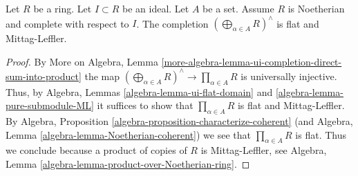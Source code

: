 \begin{lemma}
\label{lemma-completed-direct-sum-ML}
Let $R$ be a ring. Let $I \subset R$ be an ideal. Let $A$ be a set.
Assume $R$ is Noetherian and complete with respect to $I$. The completion
$(\bigoplus\nolimits_{\alpha \in A} R)^\wedge$
is flat and Mittag-Leffler.
\end{lemma}

\begin{proof}
By
More on Algebra, Lemma
\ref{more-algebra-lemma-ui-completion-direct-sum-into-product}
the map $(\bigoplus\nolimits_{\alpha \in A} R)^\wedge
\to \prod_{\alpha \in A} R$ is universally injective.
Thus, by
Algebra, Lemmas \ref{algebra-lemma-ui-flat-domain} and
\ref{algebra-lemma-pure-submodule-ML}
it suffices to show that $\prod_{\alpha \in A} R$ is flat and Mittag-Leffler.
By
Algebra, Proposition \ref{algebra-proposition-characterize-coherent}
(and
Algebra, Lemma \ref{algebra-lemma-Noetherian-coherent})
we see that $\prod_{\alpha \in A} R$ is flat.
Thus we conclude because a product of copies of $R$ is Mittag-Leffler, see
Algebra, Lemma \ref{algebra-lemma-product-over-Noetherian-ring}.
\end{proof}
